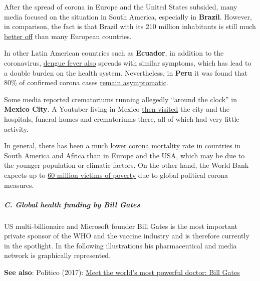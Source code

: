 After the spread of corona in Europe and the United States subsided,
many media focused on the situation in South America, especially in
\textbf{Brazil}. However, in comparison, the fact is that Brazil with
its 210 million inhabitants is still much
\href{https://www.statista.com/statistics/1104709/coronavirus-deaths-worldwide-per-million-inhabitants/}{better
off} than many European countries.

In other Latin American countries such as \textbf{Ecuador}, in addition
to the coronavirus,
\href{https://www.bbc.com/mundo/noticias-america-latina-52383340}{dengue
fever also} spreads with similar symptoms, which has lead to a double
burden on the health system. Nevertheless, in \textbf{Peru} it was found
that 80\% of confirmed corona cases
\href{https://exitosanoticias.pe/v1/covid-19-minsa-el-80-de-casos-confirmados-en-el-peru-son-asintomaticos/}{remain
asymptomatic}.

Some media reported crematoriums running allegedly ``around the clock''
in \textbf{Mexico City}. A Youtuber living in Mexico
\href{https://www.youtube.com/watch?v=_vQhwEZpDPE}{then visited} the
city and the hospitals, funeral homes and crematoriums there, all of
which had very little activity.

In general, there has been a
\href{https://www.msn.com/en-gb/news/world/coronavirus-why-africa-seems-to-have-few-cases/ar-BB10MNJd}{much
lower corona mortality rate} in countries in South America and Africa
than in Europe and the USA, which may be due to the younger population
or climatic factors. On the other hand, the World Bank expects up to
\href{https://www.deccanherald.com/business/economy-business/world-bank-says-covid-19-to-push-60-million-into-poverty-announces-usd-160-billion-assistance-to-100-countries-839661.html}{60
million victims of poverty} due to global political corona measures.

\hypertarget{c-global-health-funding-by-bill-gates}{%
\subparagraph{\texorpdfstring{\textbf{C. Global health funding by Bill
Gates}}{C. Global health funding by Bill Gates}}\label{c-global-health-funding-by-bill-gates}}

US multi-billionaire and Microsoft founder Bill Gates is the most
important private sponsor of the WHO and the vaccine industry and is
therefore currently in the spotlight. In the following illustrations his
pharmaceutical and media network is graphically represented.

\textbf{See also}: Politico (2017):
\href{https://www.politico.eu/article/bill-gates-who-most-powerful-doctor/}{Meet
the world's most powerful doctor: Bill Gates}

